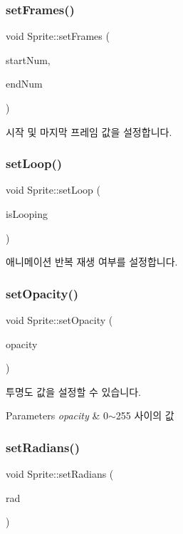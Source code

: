 \subsubsection{\texorpdfstring{setFrames()}{setFrames()}}
{\footnotesize\ttfamily void Sprite\+::set\+Frames (\begin{DoxyParamCaption}\item[{int}]{start\+Num,  }\item[{int}]{end\+Num }\end{DoxyParamCaption})}

시작 및 마지막 프레임 값을 설정합니다. \mbox{\label{class_sprite_a1c19e2d3593015f3b605591a4e1bb04d}} 
\subsubsection{\texorpdfstring{setLoop()}{setLoop()}}
{\footnotesize\ttfamily void Sprite\+::set\+Loop (\begin{DoxyParamCaption}\item[{bool}]{is\+Looping }\end{DoxyParamCaption})}

애니메이션 반복 재생 여부를 설정합니다. \mbox{\label{class_sprite_ac2c5ec49ef228830b655d1099062f286}} 
\subsubsection{\texorpdfstring{setOpacity()}{setOpacity()}}
{\footnotesize\ttfamily void Sprite\+::set\+Opacity (\begin{DoxyParamCaption}\item[{B\+Y\+TE}]{opacity }\end{DoxyParamCaption})}

투명도 값을 설정할 수 있습니다.


\begin{DoxyParams}{Parameters}
{\em opacity} & 0$\sim$255 사이의 값 \\
\hline
\end{DoxyParams}
\mbox{\label{class_sprite_a54a41090d4515f1d4f3b16180dec8d0b}} 
\subsubsection{\texorpdfstring{setRadians()}{setRadians()}}
{\footnotesize\ttfamily void Sprite\+::set\+Radians (\begin{DoxyParamCaption}\item[{float}]{rad }\end{DoxyParamCaption})}

